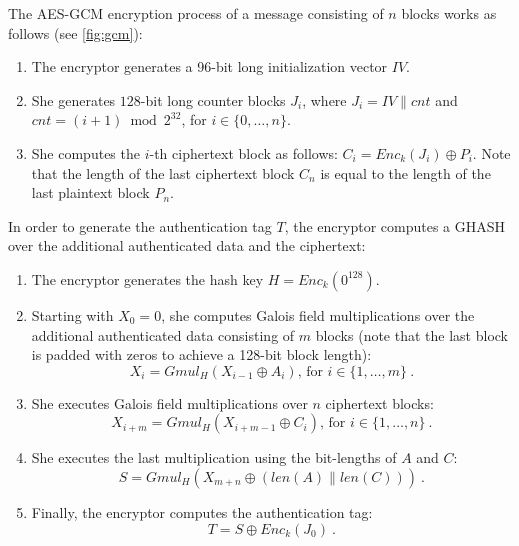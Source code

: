 
\begin{figure*}
	\centering
    \resizebox{0.6\textwidth}{!}{}
	\caption{AES-GCM encryption computed using two plaintext blocks and one block of additional authenticated data~\cite{gcm}.}
	\label{fig:gcm}
\end{figure*}




The  AES-GCM encryption process of a message consisting of $n$ blocks works as follows (see \cref{fig:gcm}):
\begin{enumerate}
	\item The encryptor generates a 96-bit long initialization vector $IV$.
	\item She generates $128$-bit long counter blocks $J_i$, where $J_i = IV \parallel cnt$ and $cnt=(i+1)\bmod{2^{32}}$, for $i \in \{0, \ldots, n\}$.
	\item She computes the $i$-th ciphertext block as follows: $C_i = Enc_k(J_i) \oplus P_i$. Note that the length of the last ciphertext block $C_n$ is equal to the length of the last plaintext block $P_n$.
\end{enumerate}

In order to generate the authentication tag $T$, the encryptor computes a GHASH over the additional authenticated data and the ciphertext:
\begin{enumerate}
	\item The encryptor generates the hash key $H = Enc_k(0^{128})$.
	\item Starting with $X_0 = 0$, she computes Galois field multiplications over the additional authenticated data consisting of $m$ blocks (note that the last block is padded with zeros to achieve a 128-bit block length):
	\[
	X_i = Gmul_H (X_{i-1} \oplus A_i) \text{, for } i \in \{1, \ldots, m\}~.
	\]
	\item She executes Galois field multiplications over $n$ ciphertext blocks:
	\[
	X_{i+m} = Gmul_H (X_{i+m-1} \oplus C_i) \text{, for } i \in \{1, \ldots, n\}~.
	\]
    \item She executes the last multiplication using the bit-lengths of $A$ and $C$: 
        $$S = Gmul_H(X_{m+n} \oplus (len(A) \parallel len(C)))~.$$
	\item Finally, the encryptor computes the authentication tag:
	\[
	T = S \oplus Enc_k(J_0)~.
	\]
\end{enumerate}

